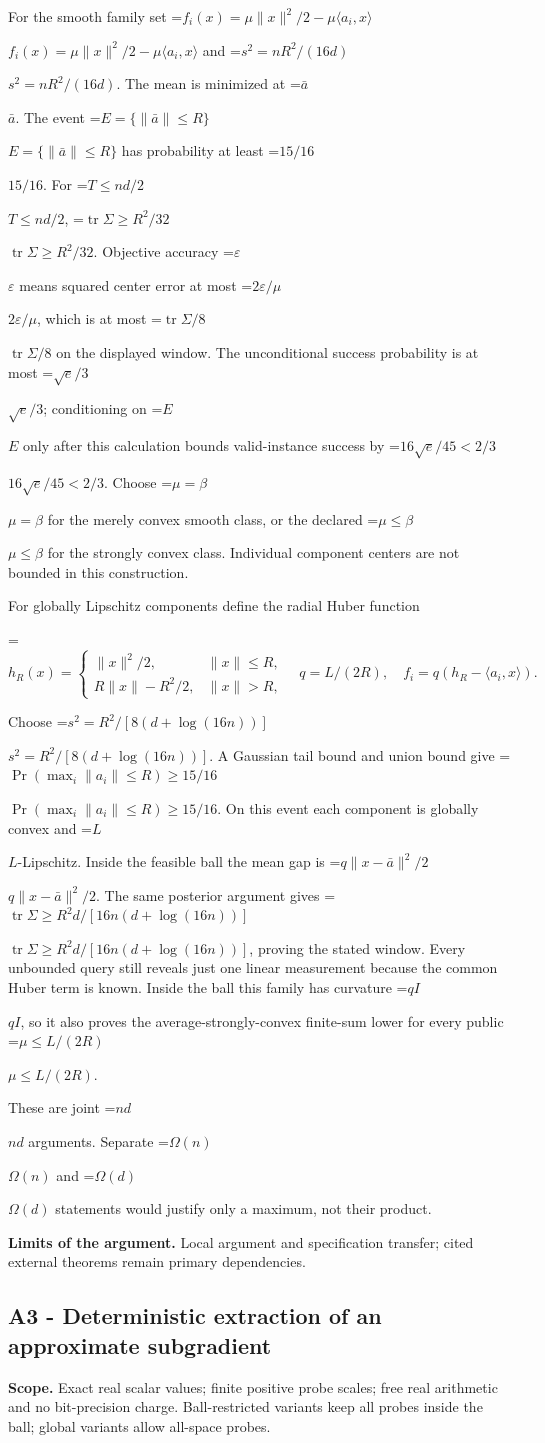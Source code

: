 \documentclass[10pt,a4paper]{article}
\newcommand{\AtlasMath}[1]{\par\begingroup\centering\setbox0=\hbox{$\displaystyle #1$}\ifdim\wd0>1.4\linewidth\typeout{ATLAS WIDE FORMULA: \the\wd0}\fi\ifdim\wd0>\linewidth\resizebox{\linewidth}{!}{\box0}\else\box0\fi\par\endgroup}
\newcommand{\AtlasInlineMath}[1]{\begingroup\setbox0=\hbox{$#1$}\ifdim\wd0>.4\linewidth\endgroup\AtlasMath{#1}\else\endgroup$#1$\fi}
\begin{document}
For the smooth family set \AtlasInlineMath{f_i(x)=\mu\|x\|^2/2-\mu\langle a_i,x\rangle} and \AtlasInlineMath{s^2=nR^2/(16d)}. The mean is minimized at \AtlasInlineMath{\bar a}. The event \AtlasInlineMath{E=\{\|\bar a\|\le R\}} has probability at least \AtlasInlineMath{15/16}. For \AtlasInlineMath{T\le nd/2}, \AtlasInlineMath{\operatorname{tr}\Sigma\ge R^2/32}. Objective accuracy \AtlasInlineMath{\varepsilon} means squared center error at most \AtlasInlineMath{2\varepsilon/\mu}, which is at most \AtlasInlineMath{\operatorname{tr}\Sigma/8} on the displayed window. The unconditional success probability is at most \AtlasInlineMath{\sqrt e/3}; conditioning on \AtlasInlineMath{E} only after this calculation bounds valid-instance success by \AtlasInlineMath{16\sqrt e/45<2/3}. Choose \AtlasInlineMath{\mu=\beta} for the merely convex smooth class, or the declared \AtlasInlineMath{\mu\le\beta} for the strongly convex class. Individual component centers are not bounded in this construction.

For globally Lipschitz components define the radial Huber function

\AtlasMath{h_R(x)=\begin{cases}\|x\|^2/2,&\|x\|\le R,\\R\|x\|-R^2/2,&\|x\|>R,\end{cases}\quad q=L/(2R),\quad f_i=q(h_R-\langle a_i,x\rangle).}

Choose \AtlasInlineMath{s^2=R^2/[8(d+\log(16n))]}. A Gaussian tail bound and union bound give \AtlasInlineMath{\Pr(\max_i\|a_i\|\le R)\ge15/16}. On this event each component is globally convex and \AtlasInlineMath{L}-Lipschitz. Inside the feasible ball the mean gap is \AtlasInlineMath{q\|x-\bar a\|^2/2}. The same posterior argument gives \AtlasInlineMath{\operatorname{tr}\Sigma\ge R^2d/[16n(d+\log(16n))]}, proving the stated window. Every unbounded query still reveals just one linear measurement because the common Huber term is known. Inside the ball this family has curvature \AtlasInlineMath{qI}, so it also proves the average-strongly-convex finite-sum lower for every public \AtlasInlineMath{\mu\le L/(2R)}.

These are joint \AtlasInlineMath{nd} arguments. Separate \AtlasInlineMath{\Omega(n)} and \AtlasInlineMath{\Omega(d)} statements would justify only a maximum, not their product.

\textbf{Limits of the argument.} Local argument and specification transfer; cited external theorems remain primary dependencies.

\subsection{A3 - Deterministic extraction of an approximate subgradient}
\textbf{Scope.} Exact real scalar values; finite positive probe scales; free real arithmetic and no bit-precision charge. Ball-restricted variants keep all probes inside the ball; global variants allow all-space probes.
\end{document}
